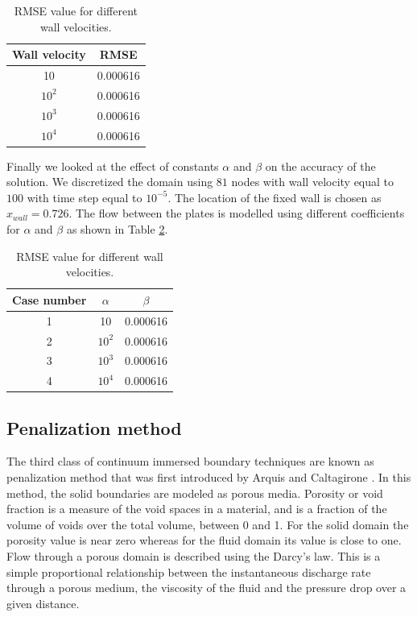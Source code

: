 \begin{table}[H]
\centering
\begin{tabular}{c | c}
	 Wall velocity & RMSE \\ \hline \hline
	 10 & 0.000616\\ \hline
	 $10^2$ & 0.000616 \\ \hline
	 $10^3$ & 0.000616 \\ \hline
	 $10^4$ & 0.000616 \\
\end{tabular}
\caption{RMSE value for different wall velocities.}
\label{table:C3_virtualBoundaryResultWallVelocityRMSE}
\end{table}

Finally we looked at the effect of constants $\alpha$ and $\beta$ on the accuracy of the solution. We discretized the domain using $81$ nodes with wall velocity equal to $100$ with time step equal to $10^{-5}$. The location of the fixed wall is chosen as $x_{wall} = 0.726$. The flow between the plates is modelled using different coefficients for $\alpha$ and $\beta$ as shown in Table \ref{table:C3_alphaBetaValues}.

\begin{table}[H]
\centering
\begin{tabular}{c | c | c}
	 Case number & $\alpha$ & $\beta$ \\ \hline \hline
	 1 & 10 & 0.000616\\ \hline
	 2 & $10^2$ & 0.000616 \\ \hline
	 3 & $10^3$ & 0.000616 \\ \hline
	 4 & $10^4$ & 0.000616 \\
\end{tabular}
\caption{RMSE value for different wall velocities.}
\label{table:C3_alphaBetaValues}
\end{table}
\subsection{Penalization method}
The third class of continuum immersed boundary techniques are known as penalization method that was first introduced by Arquis and Caltagirone \cite{ arquis1984conditions}. In this method, the solid boundaries are modeled as porous media. Porosity or void fraction is a measure of the void spaces in a material, and is a fraction of the volume of voids over the total volume, between 0 and 1. For the solid domain the porosity value is near zero whereas for the fluid domain its value is close to one. Flow through a porous domain is described using the Darcy's law. This is a simple proportional relationship between the instantaneous discharge rate through a porous medium, the viscosity of the fluid and the pressure drop over a given distance.

